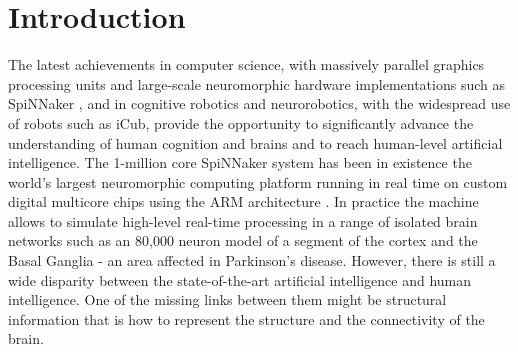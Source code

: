 \documentclass[sigconf]{acmart}
\begin{document}
\maketitle


\section{Introduction}

The latest achievements in computer science, with massively parallel graphics processing units and large-scale neuromorphic hardware implementations such as SpiNNaker \cite{Furber2013}, and in cognitive robotics and neurorobotics, with the widespread use of robots such as iCub, provide the opportunity to significantly advance the understanding of human cognition and brains and to reach human-level artificial intelligence. 
The 1-million core SpiNNaker system has been in existence the world’s largest neuromorphic computing platform running in real time on custom digital multicore chips using the ARM architecture \cite{Furber2020}.
In practice the machine allows to simulate high-level real-time processing in a range of isolated brain networks such as 
an 80,000 neuron model of a segment of the cortex and the Basal Ganglia - an area affected in Parkinson’s disease.
However, there is still a wide disparity between the state-of-the-art artificial intelligence and human intelligence.
One of the missing links between them might be structural information that is how to represent the structure and the connectivity of the brain.
\end{document}
